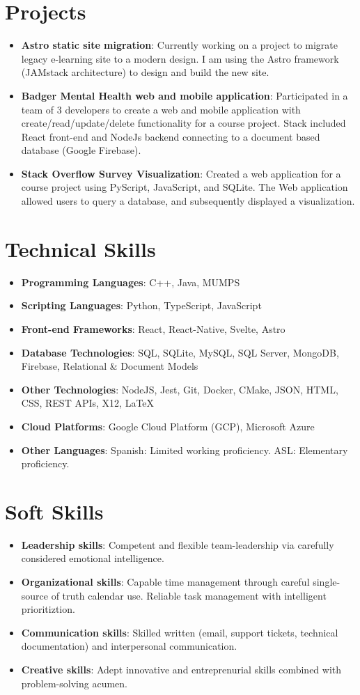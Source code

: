 \documentclass[letterpaper,11pt]{article}
\makeatletter
\newcommand{\resumeItem}[2]{
  \item\small{
    \textbf{#1}{: #2 \vspace{-2pt}}
  }
}
\newcommand{\resumeSubSubheading}[2]{
    \begin{tabular*}{0.97\textwidth}{l@{\extracolsep{\fill}}r}
      \textit{\small#1} & \textit{\small #2} \\
    \end{tabular*}\vspace{-2pt}
}
\newcommand{\resumeSubItem}[2]{\resumeItem{#1}{#2}\vspace{-4pt}}
\newcommand{\resumeSubHeadingListStart}{\begin{itemize}[leftmargin=*]}
\newcommand{\resumeSubHeadingListEnd}{\end{itemize}}
\newcommand{\resumeItemListStart}{\begin{itemize}}
\newcommand{\resumeItemListEnd}{\end{itemize}\vspace{-5pt}}
\makeatother
\begin{document}

\section{Projects}
  \resumeSubHeadingListStart
    \resumeSubItem{Astro static site migration}
      {Currently working on a project to migrate legacy e-learning site to a modern design. I am using the Astro framework (JAMstack architecture) to design and build the new site.}
    \resumeSubItem{Badger Mental Health web and mobile application}
      {Participated in a team of 3 developers to create a web and mobile application with create/read/update/delete functionality for a course project. Stack included React front-end and NodeJs backend connecting to a document based database (Google Firebase).}
    \resumeSubItem{Stack Overflow Survey Visualization}
      {Created a web application for a course project using PyScript, JavaScript, and SQLite. The Web application allowed users to query a database, and subsequently displayed a visualization.}
  \resumeSubHeadingListEnd

\section{Technical Skills}
  \resumeSubHeadingListStart
    \resumeSubItem{Programming Languages}{C++, Java, MUMPS}
    \resumeSubItem{Scripting Languages}{Python, TypeScript, JavaScript}
    \resumeSubItem{Front-end Frameworks}{React, React-Native, Svelte, Astro}
    \resumeSubItem{Database Technologies}{SQL, SQLite, MySQL, SQL Server, MongoDB, Firebase, Relational \& Document Models}
    \resumeSubItem{Other Technologies}{NodeJS, Jest, Git, Docker, CMake, JSON, HTML, CSS, REST APIs, X12, LaTeX}
    \resumeSubItem{Cloud Platforms}{Google Cloud Platform (GCP), Microsoft Azure}
    \resumeSubItem{Other Languages}{Spanish: Limited working proficiency. ASL: Elementary proficiency.}
  \resumeSubHeadingListEnd

\section{Soft Skills}
  \resumeSubHeadingListStart
    \resumeSubItem{Leadership skills}{Competent and flexible team-leadership via carefully considered emotional intelligence.}
    \resumeSubItem{Organizational skills}{Capable time management through careful single-source of truth calendar use. Reliable task management with intelligent prioritiztion.}
    \resumeSubItem{Communication skills}{Skilled written (email, support tickets, technical documentation) and interpersonal communication.}
    \resumeSubItem{Creative skills}{Adept innovative and entreprenurial skills combined with problem-solving acumen.}
  \resumeSubHeadingListEnd
\end{document}
